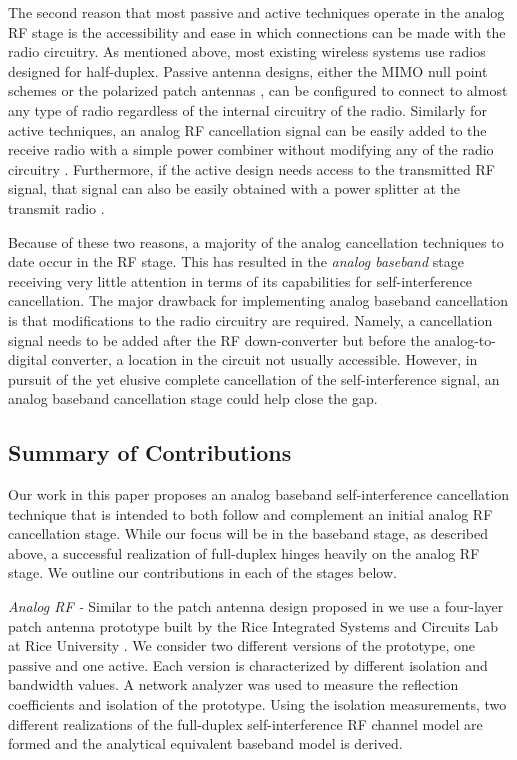 \documentclass[12pt, journal,draftcls,letterpaper,onecolumn]{IEEEtran}
\begin{document}
The second reason that most passive and active techniques operate in the analog RF stage is the accessibility and ease in which connections can be made with the radio circuitry.  As mentioned above, most existing wireless systems use radios designed for half-duplex.  Passive antenna designs, either the MIMO null point schemes \cite{2012_MIDU} or the polarized patch antennas \cite{2010_Patch_Sweden}, can be configured to connect to almost any type of radio regardless of the internal circuitry of the radio.  Similarly for active techniques, an analog RF cancellation signal can be easily added to the receive radio with a simple power combiner without modifying any of the radio circuitry \cite{2012_Melissa_TWC}.  Furthermore, if the active design needs access to the transmitted RF signal, that signal can also be easily obtained with a power splitter at the transmit radio \cite{2013_Stanford_Sigcomm}.  

Because of these two reasons, a majority of the analog cancellation techniques to date occur in the RF stage.  This has resulted in the \emph{analog baseband} stage receiving very little attention in terms of its capabilities for self-interference cancellation.  The major drawback for implementing analog baseband cancellation is that modifications to the radio circuitry are required.  Namely, a cancellation signal needs to be added after the RF down-converter but before the analog-to-digital converter, a location in the circuit not usually accessible.  However, in pursuit of the yet elusive complete cancellation of the self-interference signal, an analog baseband cancellation stage could help close the gap.  

\subsection{Summary of Contributions}
Our work in this paper proposes an analog baseband self-interference cancellation technique that is intended to both follow and complement an initial analog RF cancellation stage.  While our focus will be in the baseband stage, as described above, a successful realization of full-duplex hinges heavily on the analog RF  stage.  We outline our contributions in each of the stages below. 

\emph{Analog RF -} Similar to the patch antenna design proposed in \cite{2011_patch_antenna} we use a four-layer patch antenna prototype built by the Rice Integrated Systems and Circuits Lab at Rice University \cite{RISC_WEB}.  We consider two different versions of the prototype, one passive and one active.  Each version is characterized by different isolation and bandwidth values.   A network analyzer was used to measure the reflection coefficients and isolation of the prototype.  Using the isolation measurements, two different realizations of the full-duplex self-interference RF channel model are formed and the analytical equivalent baseband model is derived.  
\end{document}
